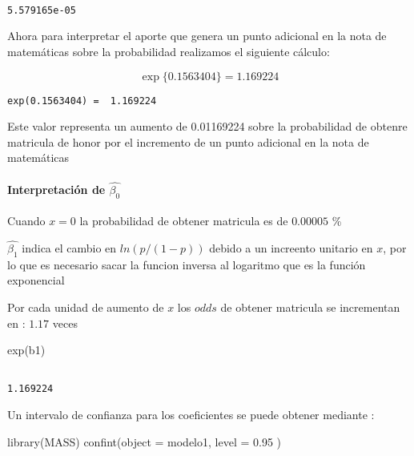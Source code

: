 \documentclass[
]{article}
\newenvironment{Shaded}{\begin{snugshade}}{\end{snugshade}}
\newcommand{\AttributeTok}[1]{\textcolor[rgb]{0.77,0.63,0.00}{#1}}
\newcommand{\FloatTok}[1]{\textcolor[rgb]{0.00,0.00,0.81}{#1}}
\newcommand{\FunctionTok}[1]{\textcolor[rgb]{0.00,0.00,0.00}{#1}}
\newcommand{\NormalTok}[1]{#1}
\begin{document}
\begin{verbatim}
             
5.579165e-05 
\end{verbatim}

Ahora para interpretar el aporte que genera un punto adicional en la
nota de matemáticas sobre la probabilidad realizamos el siguiente
cálculo:

\[\exp{\{ 0.1563404 \}} = 1.169224\]

\begin{verbatim}
exp(0.1563404) =  1.169224
\end{verbatim}

Este valor representa un aumento de 0.01169224 sobre la probabilidad de
obtenre matricula de honor por el incremento de un punto adicional en la
nota de matemáticas

\hypertarget{interpretaciuxf3n-de-widehatbeta_0}{%
\paragraph{\texorpdfstring{Interpretación de
\(\widehat{\beta_{0}}\)}{Interpretación de \textbackslash widehat\{\textbackslash beta\_\{0\}\}}}\label{interpretaciuxf3n-de-widehatbeta_0}}

Cuando \(x=0\) la probabilidad de obtener matricula es de \(0.00005\) \%

\(\widehat{\beta_{1}}\) indica el cambio en \(ln(p/(1-p))\) debido a un
increento unitario en \(x\), por lo que es necesario sacar la funcion
inversa al logaritmo que es la función exponencial

Por cada unidad de aumento de \(x\) los \(odds\) de obtener matricula se
incrementan en : \(1.17\) veces

\begin{Shaded}
\begin{Highlighting}[]
\FunctionTok{exp}\NormalTok{(b1)}
\end{Highlighting}
\end{Shaded}

\begin{verbatim}
         
1.169224 
\end{verbatim}

Un intervalo de confianza para los coeficientes se puede obtener
mediante :

\begin{Shaded}
\begin{Highlighting}[]
\FunctionTok{library}\NormalTok{(MASS)}
\FunctionTok{confint}\NormalTok{(}\AttributeTok{object =}\NormalTok{ modelo1, }\AttributeTok{level =} \FloatTok{0.95}\NormalTok{ )}
\end{Highlighting}
\end{Shaded}
\end{document}
